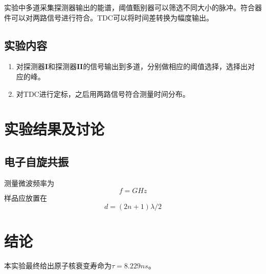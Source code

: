 \documentclass[12pt]{ctexart}
\begin{document}
实验中多道采集探测器输出的能谱，阈值甄别器可以筛选不同大小的脉冲。符合器件可以对两路信号进行符合。TDC可以将时间差转换为幅度输出。
\subsection{实验内容}
\begin{enumerate}
    \item 对探测器$\mathbf{I}$和探测器$\mathbf{II}$的信号输出到多道，分别做相应的阈值选择，选择出对应的峰。
    \item 对TDC进行定标，之后用两路信号符合测量时间分布。
\end{enumerate}
\section{实验结果及讨论}
\subsection{电子自旋共振}
测量微波频率为
\[f=GHz\]
样品应放置在
\[d=(2n+1)\lambda/2\]

\section{结论}
本实验最终给出原子核衰变寿命为$\tau=8.229ns$。

\end{document}
